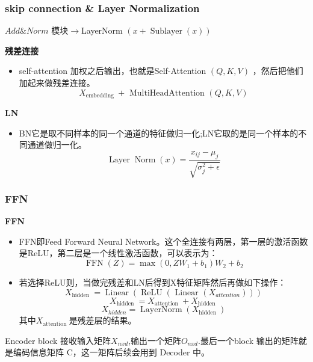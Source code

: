 \documentclass[10pt,t,handout]{beamer}
\begin{document}
\begin{frame}

\frametitle{skip connection \& Layer Normalization}

$Add \& Norm$ 模块$\rightarrow $LayerNorm $(x+\operatorname{Sublayer}(x))$
 
 \begin{block}{\textbf{残差连接}}
 	\begin{itemize}
 		\item<0-> self-attention 加权之后输出，也就是Self-Attention $(Q, K, V)$ ，然后把他们加起来做残差连接。
 		$$
 		X_{\text {embedding }}+\text { MultiHeadAttention }(Q, K, V)
 		$$  
 	\end{itemize}
 \end{block}
 
  \begin{block}{\textbf{LN}}
 	\begin{itemize}
 		\item<0-> BN它是取不同样本的同一个通道的特征做归一化;LN它取的是同一个样本的不同通道做归一化。
 	 $$
 	 \operatorname{Layer} \operatorname{Norm}(x)=\frac{x_{i j}-\mu_{j}}{\sqrt{\sigma_{j}^{2}+\epsilon}}
 	 $$
 	\end{itemize}
 \end{block}
\end{frame}
\begin{frame}
\frametitle{FFN}
 \begin{block}{\textbf{FFN}}
	\begin{itemize}
		\item<0-> FFN即Feed Forward Neural Network。这个全连接有两层，第一层的激活函数是ReLU，第二层是一个线性激活函数，可以表示为：
	 $$
	 \operatorname{FFN}(Z)=\max \left(0, Z W_{1}+b_{1}\right) W_{2}+b_{2}
	 $$
	 	\item<0->若选择ReLU则，当做完残差和LN后得到X特征矩阵然后再做如下操作：\\
	 	$$
	 	X_{\text {hidden }}=\operatorname{Linear}\left(\operatorname{ReLU}\left(\text { Linear }\left(X_{a t t e n t i o n}\right)\right)\right)
	 	$$ 
	 	$$
	 	X_{\text {hidden }}=X_{\text {attention }}+X_{\text {hidden }}
	 	$$
	 	$$
	 	X_{h i d d e n}=\operatorname{LayerNorm}\left(X_{\text {hidden }}\right)
	 	$$ 
	 	其中$X_{\text {attention }}$是残差层的结果。
	\end{itemize}
\end{block}
Encoder block 接收输入矩阵$X_{nxd}$,输出一个矩阵$O_{nxd}$.最后一个block 输出的矩阵就是编码信息矩阵 C，这一矩阵后续会用到 Decoder 中。
\end{frame}
\end{document}
